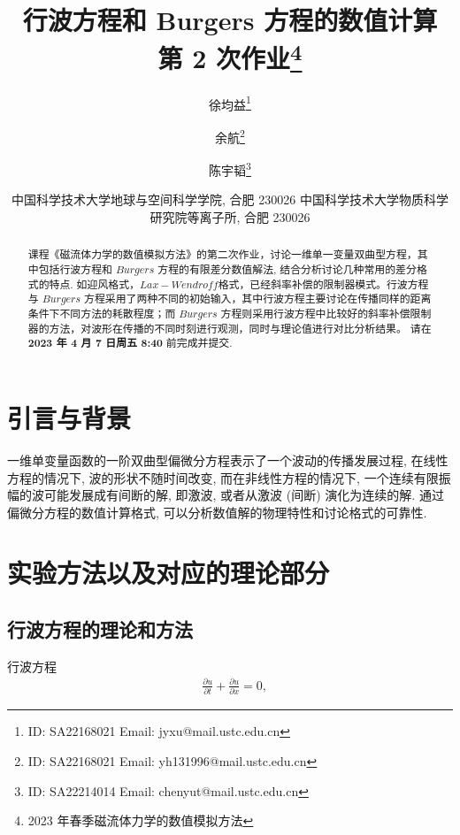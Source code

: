 \documentclass[10.5pt
]{article}
\def\due{2023 年 4 月 7 日周五 8:40}
\def\Term{2023 年春季}
\def\Course{磁流体力学的数值模拟方法}
\begin{document}
\title{行波方程和 Burgers 方程的数值计算 \\
  第 2 次作业\footnote{\Term\Course}}

\author{徐均益\footnote{ID: SA22168021 Email: jyxu@mail.ustc.edu.cn}
  \and
  余航\footnote{ID: SA22168021 Email: yh131996@mail.ustc.edu.cn}
  \and
  陈宇韬\footnote{ID: SA22214014 Email: chenyut@mail.ustc.edu.cn}
}

\date{%
\scriptsize%
中国科学技术大学地球与空间科学学院, 合肥 230026
中国科学技术大学物质科学研究院等离子所, 合肥 230026
%
}


\maketitle

\begin{abstract}
课程《磁流体力学的数值模拟方法》的第二次作业，讨论一维单一变量双曲型方程，其中包括行波方程和 $Burgers$ 方程的有限差分数值解法,
结合分析讨论几种常用的差分格式的特点. 如迎风格式，$Lax-Wendroff$格式，已经斜率补偿的限制器模式。行波方程与 $Burgers$ 方程采用了两种不同的初始输入，其中行波方程主要讨论在传播同样的距离条件下不同方法的耗散程度；而 $Burgers$ 方程则采用行波方程中比较好的斜率补偿限制器的方法，对波形在传播的不同时刻进行观测，同时与理论值进行对比分析结果。
请在 \textbf{\due} 前完成并提交.
\end{abstract}

\section{引言与背景}
一维单变量函数的一阶双曲型偏微分方程表示了一个波动的传播发展过程, 在线性方程的情况下,
波的形状不随时间改变, 而在非线性方程的情况下, 一个连续有限振幅的波可能发展成有间断的解, 即激波, 或者从激波 (间断) 演化为连续的解\citep{Whitham1999}.
通过偏微分方程的数值计算格式, 可以分析数值解的物理特性和讨论格式的可靠性.

\section{实验方法以及对应的理论部分}
\subsection{行波方程的理论和方法}
行波方程
\begin{align}
& \frac{\partial u}{\partial t} + \frac{\partial u}{\partial x} = 0,
\label{EqnCon}
\end{align}
\end{document}
